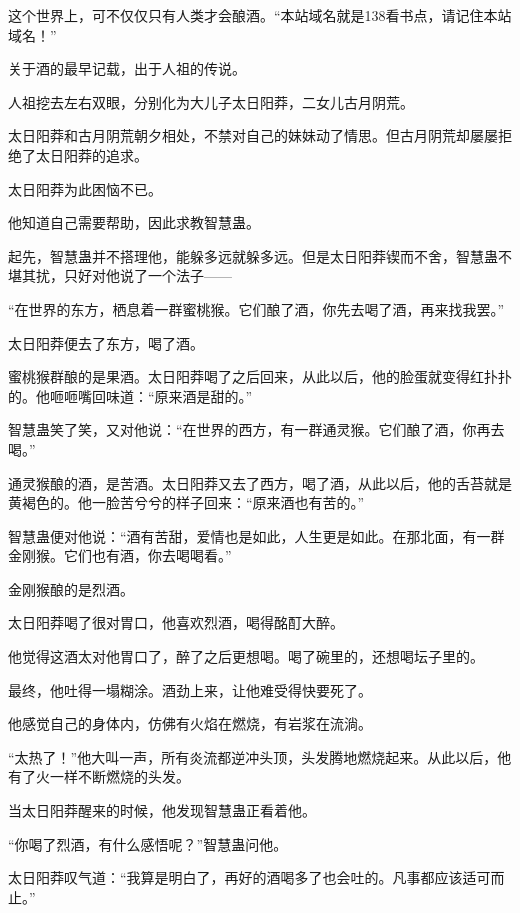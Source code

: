 
\begin{this_body}

这个世界上，可不仅仅只有人类才会酿酒。“本站域名就是138看书点，请记住本站域名！”

关于酒的最早记载，出于人祖的传说。

人祖挖去左右双眼，分别化为大儿子太日阳莽，二女儿古月阴荒。

太日阳莽和古月阴荒朝夕相处，不禁对自己的妹妹动了情思。但古月阴荒却屡屡拒绝了太日阳莽的追求。

太日阳莽为此困恼不已。

他知道自己需要帮助，因此求教智慧蛊。

起先，智慧蛊并不搭理他，能躲多远就躲多远。但是太日阳莽锲而不舍，智慧蛊不堪其扰，只好对他说了一个法子——

“在世界的东方，栖息着一群蜜桃猴。它们酿了酒，你先去喝了酒，再来找我罢。”

太日阳莽便去了东方，喝了酒。

蜜桃猴群酿的是果酒。太日阳莽喝了之后回来，从此以后，他的脸蛋就变得红扑扑的。他咂咂嘴回味道：“原来酒是甜的。”

智慧蛊笑了笑，又对他说：“在世界的西方，有一群通灵猴。它们酿了酒，你再去喝。”

通灵猴酿的酒，是苦酒。太日阳莽又去了西方，喝了酒，从此以后，他的舌苔就是黄褐色的。他一脸苦兮兮的样子回来：“原来酒也有苦的。”

智慧蛊便对他说：“酒有苦甜，爱情也是如此，人生更是如此。在那北面，有一群金刚猴。它们也有酒，你去喝喝看。”

金刚猴酿的是烈酒。

太日阳莽喝了很对胃口，他喜欢烈酒，喝得酩酊大醉。

他觉得这酒太对他胃口了，醉了之后更想喝。喝了碗里的，还想喝坛子里的。

最终，他吐得一塌糊涂。酒劲上来，让他难受得快要死了。

他感觉自己的身体内，仿佛有火焰在燃烧，有岩浆在流淌。

“太热了！”他大叫一声，所有炎流都逆冲头顶，头发腾地燃烧起来。从此以后，他有了火一样不断燃烧的头发。

当太日阳莽醒来的时候，他发现智慧蛊正看着他。

“你喝了烈酒，有什么感悟呢？”智慧蛊问他。

太日阳莽叹气道：“我算是明白了，再好的酒喝多了也会吐的。凡事都应该适可而止。”


\end{this_body}
